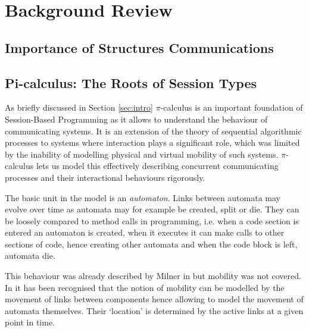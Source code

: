 
\chapter{Background Review}
\label{ch:background}


\section{Importance of Structures Communications}
\label{sec:structuredcommms}


\section{Pi-calculus: The Roots of Session Types}
\label{sec:picalculus}
	
	As briefly discussed in Section \ref{sec:intro} $\pi$-calculus is an important foundation of Session-Based Programming as it allows to understand the behaviour of communicating systems. It is an extension of the theory of sequential algorithmic processes to systems where interaction plays a significant role, which was limited by the inability of modelling physical and virtual mobility of such systems. $\pi$-calculus lets us model this effectively describing concurrent communicating processes and their interactional behaviours rigorously.

The basic unit in the model is an \textit{automaton}. Links between automata may evolve over time as automata may for example be created, split or die. They can be loosely compared to method calls in programming, i.e. when a code section is entered an automaton is created, when it executes it can make calls to other sections of code, hence creating other automata and when the code block is left, automata die.

This behaviour was already described by Milner in \cite{comm_sys_calc} but mobility was not covered. In \cite{pi-calculus} it has been recognised that the notion of mobility can be modelled by the movement of links between components hence allowing to model the movement of automata themselves. Their `location' is determined by the active links at a given point in time.

